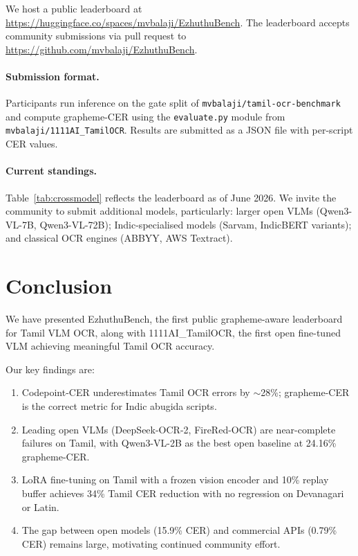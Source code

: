 \documentclass[11pt,a4paper]{article}
\begin{document}
We host a public leaderboard at
\url{https://huggingface.co/spaces/mvbalaji/EzhuthuBench}.
The leaderboard accepts community submissions via pull request to
\url{https://github.com/mvbalaji/EzhuthuBench}.

\paragraph{Submission format.}
Participants run inference on the gate split of
\texttt{mvbalaji/tamil-ocr-benchmark} and compute grapheme-CER using the
\texttt{evaluate.py} module from \texttt{mvbalaji/1111AI\_TamilOCR}.
Results are submitted as a JSON file with per-script CER values.

\paragraph{Current standings.}
Table~\ref{tab:crossmodel} reflects the leaderboard as of June 2026.
We invite the community to submit additional models, particularly:
larger open VLMs (Qwen3-VL-7B, Qwen3-VL-72B);
Indic-specialised models (Sarvam, IndicBERT variants);
and classical OCR engines (ABBYY, AWS Textract).

\section{Conclusion}

We have presented EzhuthuBench, the first public grapheme-aware leaderboard
for Tamil VLM OCR, along with 1111AI\_TamilOCR, the first open fine-tuned VLM
achieving meaningful Tamil OCR accuracy.

Our key findings are:
\begin{enumerate}
  \item Codepoint-CER underestimates Tamil OCR errors by $\sim$28\%;
        grapheme-CER is the correct metric for Indic abugida scripts.
  \item Leading open VLMs (DeepSeek-OCR-2, FireRed-OCR) are near-complete
        failures on Tamil, with Qwen3-VL-2B as the best open baseline at
        24.16\% grapheme-CER.
  \item LoRA fine-tuning on Tamil with a frozen vision encoder and 10\%
        replay buffer achieves 34\% Tamil CER reduction with no regression
        on Devanagari or Latin.
  \item The gap between open models (15.9\% CER) and commercial APIs
        (0.79\% CER) remains large, motivating continued community effort.
\end{enumerate}
\end{document}
